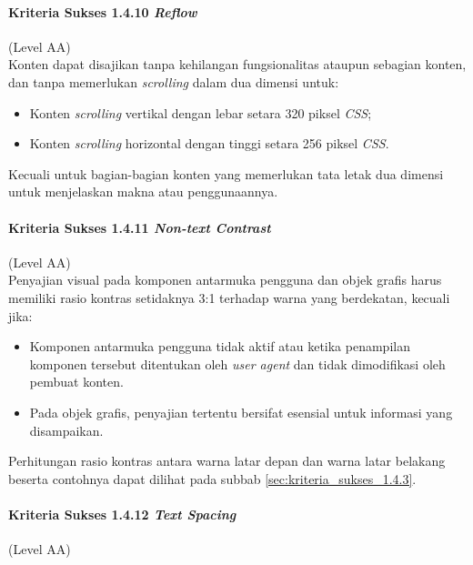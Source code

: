 \paragraph{Kriteria Sukses 1.4.10 \textit{Reflow}}
\label{sec:kriteria_sukses_1.4.10}
(Level AA)\\

Konten dapat disajikan tanpa kehilangan fungsionalitas ataupun sebagian konten, dan tanpa memerlukan \textit{scrolling} dalam dua dimensi untuk:

\begin{itemize}
	\item Konten \textit{scrolling} vertikal dengan lebar setara 320 piksel \textit{CSS};
	\item Konten \textit{scrolling} horizontal dengan tinggi setara 256 piksel \textit{CSS}.
\end{itemize}

Kecuali untuk bagian-bagian konten yang memerlukan tata letak dua dimensi untuk menjelaskan makna atau penggunaannya.

\paragraph{Kriteria Sukses 1.4.11 \textit{Non-text Contrast}}
\label{sec:kriteria_sukses_1.4.11}
(Level AA)\\

Penyajian visual pada komponen antarmuka pengguna dan objek grafis harus memiliki rasio kontras setidaknya 3:1 terhadap warna yang berdekatan, kecuali jika:

\begin{itemize}
	\item Komponen antarmuka pengguna tidak aktif atau ketika penampilan komponen tersebut ditentukan oleh \textit{user agent} dan tidak dimodifikasi oleh pembuat konten.
	\item Pada objek grafis, penyajian tertentu bersifat esensial untuk informasi yang disampaikan.
\end{itemize}

Perhitungan rasio kontras antara warna latar depan dan warna latar belakang beserta contohnya dapat dilihat pada subbab \ref{sec:kriteria_sukses_1.4.3}.

\paragraph{Kriteria Sukses 1.4.12 \textit{Text Spacing}}
\label{sec:kriteria_sukses_1.4.12}
(Level AA)\\

